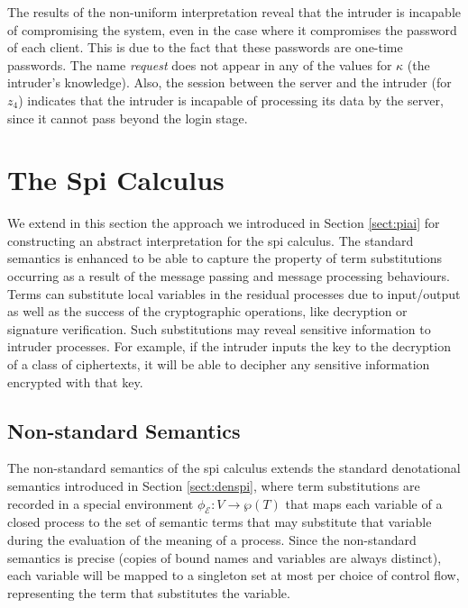\documentclass[10pt,a4paper,final,oneside,fleqn]{book}
\begin{document}
\noindent
The results of the non-uniform interpretation reveal that the intruder is incapable of compromising the system, even in the case where it compromises the password of each client.  This is due to the fact that these passwords are one-time passwords.  The name {\itshape request\/} does not appear in any of the values for $\kappa$ (the intruder's knowledge).  Also, the session between the server and the intruder (for $z_4$) indicates that the intruder is incapable of processing its data by the server, since it cannot pass beyond the login stage.
\section{The Spi Calculus}
We extend in this section the approach we introduced in Section \ref{sect:piai} for constructing an abstract interpretation for the spi calculus.  The standard semantics is enhanced to be able to capture the property of term substitutions occurring as a result of the message passing and message processing behaviours.  Terms can substitute local variables in the residual processes due to input/output as well as the success of the cryptographic operations, like decryption or signature verification.  Such substitutions may reveal sensitive information to intruder processes.  For example, if the intruder inputs the key to the decryption of a class of ciphertexts, it will be able to decipher any sensitive information encrypted with that key.
\subsection{Non-standard Semantics\label{sect:nonstandspi}}
The non-standard semantics of the spi calculus extends the standard denotational semantics introduced in Section \ref{sect:denspi}, where term substitutions are recorded in a special environment $\phi_\mathcal{E}:V\to\wp(T)$ that maps each variable of a closed process to the set of semantic terms that may substitute that variable during the evaluation of the meaning of a process.  Since the non-standard semantics is precise (copies of bound names and variables are always distinct), each variable will be mapped to a singleton set at most per choice of control flow, representing the term that substitutes the variable.
\end{document}
